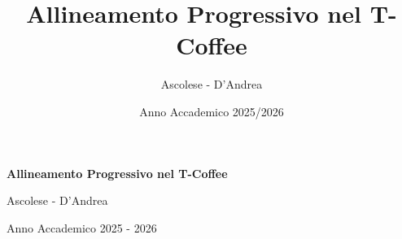 \documentclass[a4paper,14pt,oneside]{extarticle}
\title{Allineamento Progressivo nel T-Coffee}
\author{Ascolese - D'Andrea}
\date{Anno Accademico 2025/2026}
\begin{document}
\nocite{*} %

\begin{titlepage}
    \centering %
    
    \vspace*{\fill} 

    {\huge \textbf{Allineamento Progressivo nel T-Coffee} \par}
    \vspace{1.5cm}

    \vspace*{\fill} 

    {\large Ascolese - D'Andrea \par}
    {\large Anno Accademico 2025 - 2026 \par}
\end{titlepage}

\newpage
\tableofcontents









\appendix


\newpage
\printbibliography[title={Bibliografia}, heading=bibintoc]
\end{document}
